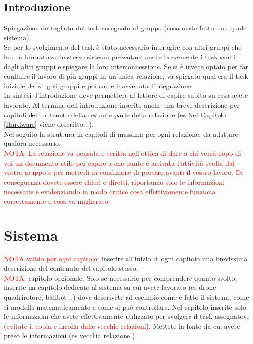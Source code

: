 \documentclass[11pt]{report}
\begin{document}
\pagestyle{plain}

\section*{Introduzione}
Spiegazione dettagliata del task assegnato al gruppo (cosa avete fatto e su quale sistema).\\
Se per lo svolgimento del task è stato necessario interagire con altri gruppi che hanno lavorato sullo stesso sistema presentare anche brevemente i task svolti dagli altri gruppi e spiegare la loro interconnessione.
Se si è invece optato per far confluire il lavoro di più gruppi in un'unica relazione, va spiegato qual era il task iniziale dei singoli gruppi e poi come è avvenuta l'integrazione. \\
In sintesi, l'introduzione deve permettere al lettore di capire subito su cosa avete lavorato.
Al termine dell'introduzione inserite anche una breve descrizione per capitoli del contenuto della restante parte della relazione (es Nel Capitolo \ref{Hardware} viene descritto...). \\
\newline
Nel seguito la struttura in capitoli di massima per ogni relazione, da adattare qualora necessario. \\
\textcolor{red}{NOTA: La relazione va pensata e scritta nell'ottica di dare a chi verrà dopo di voi un documento utile per capire a che punto è arrivata l'attività svolta dal vostro gruppo e per metterli in condizione di portare avanti il vostro lavoro. Di conseguenza dovete essere chiari e diretti, riportando solo le informazioni necessarie e evidenziando in modo critico cosa effettivamente funziona correttamente e cosa va migliorato}

\newpage
\chapter{Sistema}
\textcolor{red}{NOTA valido per ogni capitolo: }inserire all'inizio di ogni capitolo una brevissima descrizione del contenuto del capitolo stesso.\\
\newline
\textcolor{red}{NOTA:} capitolo opzionale.
Solo se necessario per comprendere quanto svolto, inserite un capitolo dedicato al sistema su cui avete lavorato (es drone quadrirotore, ballbot ..) dove descrivete ad esempio come è fatto il sistema, come si modella matematicamente e come si può controllare. Nel capitolo inserite solo le informazioni che avete effettivamente utilizzato per svolgere il task assegnatovi (\textcolor{red}{evitate il copia e incolla dalle vecchie relazioni}). Mettete la fonte da cui avete preso le informazioni (es vecchia relazione \cite{Relazione1}).
\end{document}
